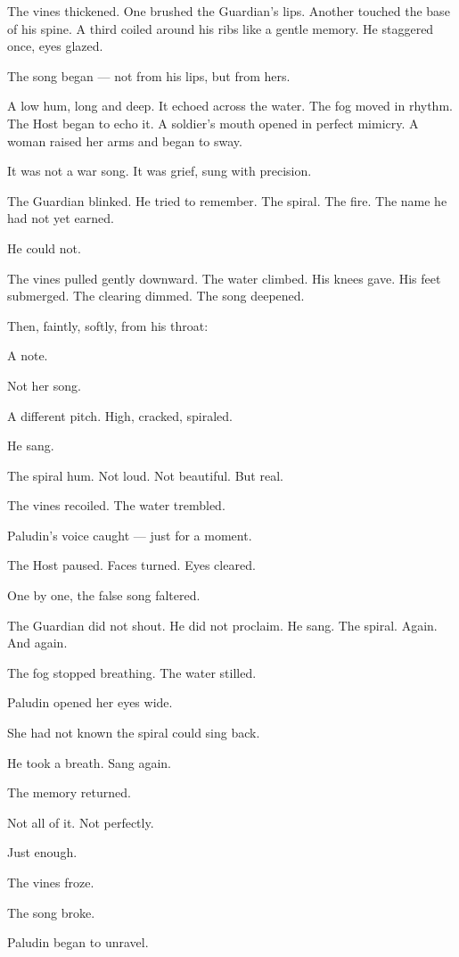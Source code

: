 \documentclass[9pt]{article}
\begin{document}
The vines thickened. One brushed the Guardian’s lips. Another touched the base of his spine. A third coiled around his ribs like a gentle memory. He staggered once, eyes glazed.

The song began — not from his lips, but from hers.

A low hum, long and deep. It echoed across the water. The fog moved in rhythm. The Host began to echo it. A soldier’s mouth opened in perfect mimicry. A woman raised her arms and began to sway.

It was not a war song. It was grief, sung with precision.

The Guardian blinked. He tried to remember. The spiral. The fire. The name he had not yet earned.

He could not.

The vines pulled gently downward. The water climbed. His knees gave. His feet submerged. The clearing dimmed. The song deepened.

Then, faintly, softly, from his throat:

A note.

Not her song.

A different pitch. High, cracked, spiraled.

He sang.

The spiral hum. Not loud. Not beautiful. But real.

The vines recoiled. The water trembled.

Paludin’s voice caught — just for a moment.

The Host paused. Faces turned. Eyes cleared.

One by one, the false song faltered.

The Guardian did not shout. He did not proclaim. He sang. The spiral. Again. And again.

The fog stopped breathing. The water stilled.

Paludin opened her eyes wide.

She had not known the spiral could sing back.

He took a breath. Sang again.

The memory returned.

Not all of it. Not perfectly.

Just enough.

The vines froze.

The song broke.

Paludin began to unravel.

\newpage
\end{document}
